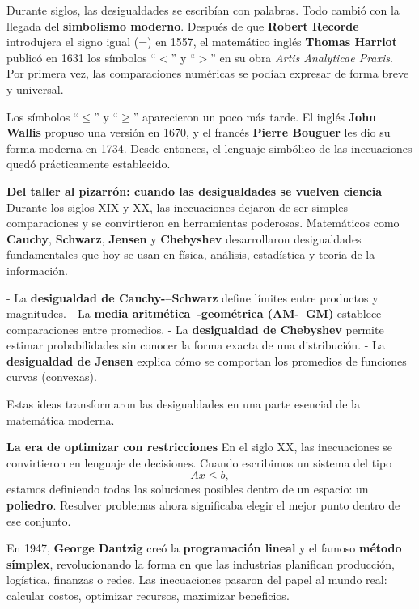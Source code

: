 \begin{reseñaplana}
Durante siglos, las desigualdades se escribían con palabras.  
Todo cambió con la llegada del \textbf{simbolismo moderno}.  
Después de que \textbf{Robert Recorde} introdujera el signo igual (=) en 1557, el matemático inglés \textbf{Thomas Harriot} 
publicó en 1631 los símbolos ``$<$'' y ``$>$'' en su obra \textit{Artis Analyticae Praxis}.  
Por primera vez, las comparaciones numéricas se podían expresar de forma breve y universal.  

Los símbolos ``$\leq$'' y ``$\geq$'' aparecieron un poco más tarde.  
El inglés \textbf{John Wallis} propuso una versión en 1670, y el francés \textbf{Pierre Bouguer} les dio su forma moderna en 1734.  
Desde entonces, el lenguaje simbólico de las inecuaciones quedó prácticamente establecido.  

\textbf{Del taller al pizarrón: cuando las desigualdades se vuelven ciencia}  
Durante los siglos XIX y XX, las inecuaciones dejaron de ser simples comparaciones y se convirtieron en herramientas poderosas.  
Matemáticos como \textbf{Cauchy}, \textbf{Schwarz}, \textbf{Jensen} y \textbf{Chebyshev} desarrollaron desigualdades fundamentales 
que hoy se usan en física, análisis, estadística y teoría de la información.  

- La \textbf{desigualdad de Cauchy-–Schwarz} define límites entre productos y magnitudes.  
- La \textbf{media aritmética–-geométrica (AM-–GM)} establece comparaciones entre promedios.  
- La \textbf{desigualdad de Chebyshev} permite estimar probabilidades sin conocer la forma exacta de una distribución.  
- La \textbf{desigualdad de Jensen} explica cómo se comportan los promedios de funciones curvas (convexas).  

Estas ideas transformaron las desigualdades en una parte esencial de la matemática moderna.  

\textbf{La era de optimizar con restricciones}  
En el siglo XX, las inecuaciones se convirtieron en lenguaje de decisiones.  
Cuando escribimos un sistema del tipo
\[
Ax \leq b,
\]
estamos definiendo todas las soluciones posibles dentro de un espacio: un \textbf{poliedro}.  
Resolver problemas ahora significaba elegir el mejor punto dentro de ese conjunto.

En 1947, \textbf{George Dantzig} creó la \textbf{programación lineal} y el famoso \textbf{método símplex}, revolucionando la forma 
en que las industrias planifican producción, logística, finanzas o redes.  
Las inecuaciones pasaron del papel al mundo real: calcular costos, optimizar recursos, maximizar beneficios.  


\end{reseñaplana}
